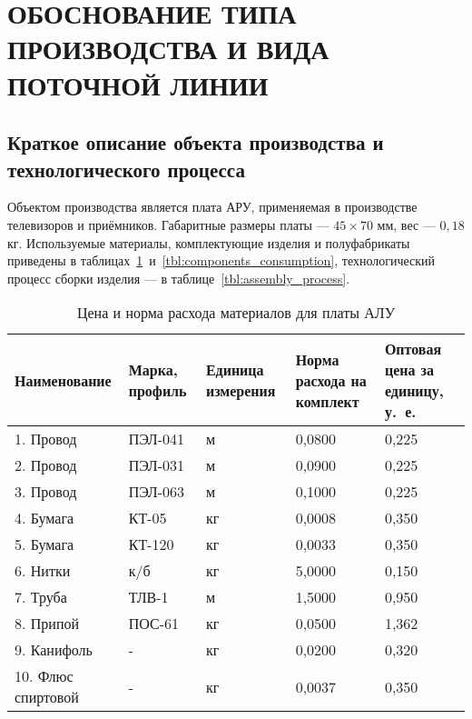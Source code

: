 \section[Обоснование типа производства и вида поточной линии]{
  ОБОСНОВАНИЕ ТИПА ПРОИЗВОДСТВА И ВИДА \\
  ПОТОЧНОЙ ЛИНИИ
}
\label{sec:choice}

\subsection{Краткое описание объекта производства и технологического процесса}

Объектом производства является плата АРУ, применяемая в производстве
телевизоров и приёмников. Габаритные размеры платы --- $45 \times 70$ мм,
вес --- $0{,}18$ кг. Используемые материалы, комплектующие изделия и полуфабрикаты
приведены в таблицах~\ref{tbl:materials_consumption}~и~\ref{tbl:components_consumption},
технологический процесс сборки изделия --- в таблице~\ref{tbl:assembly_process}.

\begin{table} [h!]
  \caption{
    Цена и норма расхода материалов для платы АЛУ
  }\label{tbl:materials_consumption}
  {\small
    \begin{tabular}{| m{3.8cm} | m{2.0cm} | m{2.1cm} | m{3.2cm} | m{3.2cm} |}
      \hline
      Наименование & Марка, профиль & Единица измерения & Норма расхода на комплект &
      Оптовая цена за единицу, у.~е. \\ \hline

      1.  Провод            & ПЭЛ-041 & м  & 0,0800 & 0,225 \\ \hline
      2.  Провод            & ПЭЛ-031 & м  & 0,0900 & 0,225 \\ \hline
      3.  Провод            & ПЭЛ-063 & м  & 0,1000 & 0,225 \\ \hline
      4.  Бумага            & КТ-05   & кг & 0,0008 & 0,350 \\ \hline
      5.  Бумага            & КТ-120  & кг & 0,0033 & 0,350 \\ \hline
      6.  Нитки             & к/б     & кг & 5,0000 & 0,150 \\ \hline
      7.  Труба             & ТЛВ-1   & м  & 1,5000 & 0,950 \\ \hline
      8.  Припой            & ПОС-61  & кг & 0,0500 & 1,362 \\ \hline
      9.  Канифоль          & -       & кг & 0,0200 & 0,320 \\ \hline
      10. Флюс спиртовой    & -       & кг & 0,0037 & 0,350 \\ \hline

    \end{tabular}
  }
\end{table}


